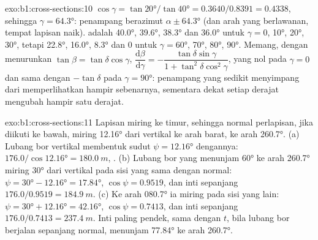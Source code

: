 \begin{solution}{exo:b1:cross-sections:10}
$\cos\gamma = \tan\ang{20}/\tan\ang{40} = 0.3640/0.8391 = 0.4338$, sehingga
$\gamma = \ang{64.3}$: penampang berazimut $\alpha \pm \ang{64.3}$ (dan arah yang berlawanan, tempat lapisan naik).  adalah
\ang{40.0}, \ang{39.6}, \ang{38.3} dan \ang{36.0} untuk $\gamma = 0$, \ang{10},
\ang{20}, \ang{30}, tetapi \ang{22.8}, \ang{16.0}, \ang{8.3} dan $0$ untuk
$\gamma = \ang{60}$, \ang{70}, \ang{80}, \ang{90}. Memang, dengan menurunkan
$\tan\beta = \tan\delta\cos\gamma$,
$\dfrac{\mathrm d\beta}{\mathrm d\gamma} =
-\dfrac{\tan\delta\sin\gamma}{1 + \tan^2\delta\cos^2\gamma}$, yang nol
pada $\gamma = 0$ dan sama dengan $-\tan\delta$ pada $\gamma = \ang{90}$: penampang yang sedikit menyimpang dari  memperlihatkan hampir  sebenarnya, sementara dekat  setiap derajat  mengubah  hampir satu derajat.
\end{solution}

\begin{solution}{exo:b1:cross-sections:11}
Lapisan miring ke timur, sehingga normal perlapisan, jika diikuti ke bawah, miring \ang{12.16} dari vertikal ke arah barat, ke arah \ang{260.7}.
(a) Lubang bor vertikal membentuk sudut $\psi = \ang{12.16}$ dengannya:
$176.0/\cos\ang{12.16} = \qty{180.0}{m}$, . (b) Lubang bor yang menunjam \ang{60} ke arah \ang{260.7} miring \ang{30} dari vertikal pada sisi yang sama dengan normal: $\psi = \ang{30} - \ang{12.16} =
\ang{17.84}$, $\cos\psi = 0.9519$, dan inti sepanjang $176.0/0.9519 =
\qty{184.9}{m}$. (c) Ke arah \ang{080.7} ia miring pada sisi yang lain:
$\psi = \ang{30} + \ang{12.16} = \ang{42.16}$, $\cos\psi = 0.7413$, dan
inti sepanjang $176.0/0.7413 = \qty{237.4}{m}$. Inti paling pendek, sama dengan
$t$, bila lubang bor berjalan sepanjang normal, menunjam \ang{77.84} ke arah
\ang{260.7}.
\end{solution}

